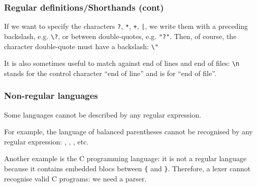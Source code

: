 %
\begin{frame}[containsverbatim]
\frametitle{Regular definitions/Shorthands (cont)}

If we want to specify the characters \verb+?+, \verb+*+, \verb|+|,
\verb+|+, we write them with a preceding backslash, e.g. \verb|\?|,
or between double-quotes, e.g. \verb+"?"+. Then, of course, the
character double-quote must have a backslash: \verb+\"+

\bigskip

It is also sometimes useful to match against end of lines and end of
files: \verb+\n+ stands for the control character ``end of line'' and
\term{\$} is for ``end of file''.

\end{frame}

%
\begin{frame}[containsverbatim]
\frametitle{Non-regular languages}

Some languages cannot be described by any regular expression.

\bigskip

For example, the language of balanced parentheses cannot be recognised
by any regular expression: \lparen\rparen,
\lparen\lparen\rparen\rparen, \lparen\rparen\lparen\rparen,
\lparen\lparen\lparen\rparen\rparen\lparen\rparen\rparen{} etc.

\bigskip

Another example is the C programming language: it is not a regular
language because it contains embedded blocs between \verb+{+ and
\verb+}+. Therefore, a lexer cannot recognise valid C programs: we
need a parser.

\end{frame}
